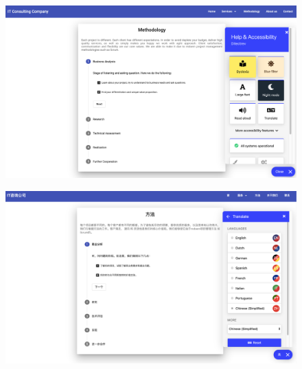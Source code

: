 \documentclass{article} %
\begin{document}
\begin{figure}[ht]
  \centering
      \includegraphics[width=1\textwidth]{thesisapp3.png}
\end{figure}
\begin{figure}[ht]
  \centering
      \includegraphics[width=1\textwidth]{thesisapp4.png}
\end{figure}
\printindex
\end{document}

